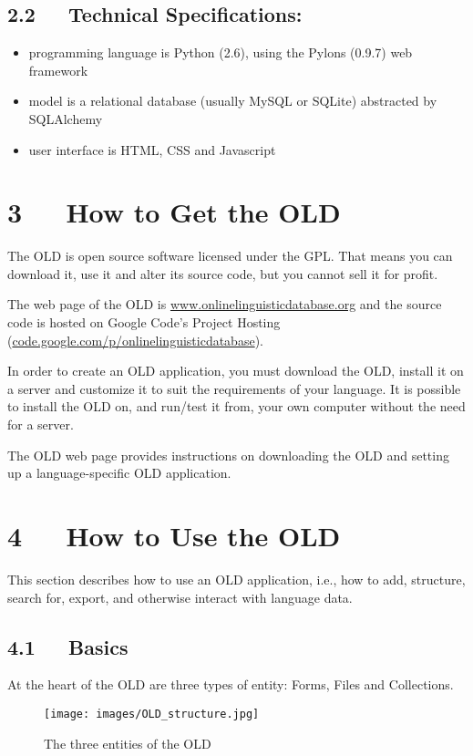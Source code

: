 \documentclass[letterpaper,10pt,english]{sphinxmanual}
\begin{document}
\section{2.2   Technical Specifications:}
\label{user_guide:technical-specifications}\begin{itemize}
\item {} 
programming language is Python (2.6), using the Pylons (0.9.7) web framework

\item {} 
model is a relational database (usually MySQL or SQLite) abstracted by
SQLAlchemy

\item {} 
user interface is HTML, CSS and Javascript

\end{itemize}


\chapter{3   How to Get the OLD}
\label{user_guide:how-to-get-the-old}
The OLD is open source software licensed under the GPL.  That means you can
download it, use it and alter its source code, but you cannot sell it for profit.

The web page of the OLD is \href{http://www.onlinelinguisticdatabase.org}{www.onlinelinguisticdatabase.org} and the source code
is hosted on Google Code's Project Hosting
(\href{http://code.google.com/p/onlinelinguisticdatabase}{code.google.com/p/onlinelinguisticdatabase}).

In order to create an OLD application, you must download the OLD, install it
on a server and customize it to suit the requirements of your language.  It is
possible to install the OLD on, and run/test it from, your own computer without
the need for a server.

The OLD web page provides instructions on downloading the OLD and setting up a
language-specific OLD application.


\chapter{4   How to Use the OLD}
\label{user_guide:how-to-use-the-old}
This section describes how to use an OLD application, i.e., how to add,
structure, search for, export, and otherwise interact with language data.


\section{4.1   Basics}
\label{user_guide:basics}
At the heart of the OLD are three types of entity: Forms, Files and Collections.
\begin{figure}[htbp]
\centering
\capstart

\texttt{[image: images/OLD\_structure.jpg]}
\caption{The three entities of the OLD}\end{figure}
\end{document}
